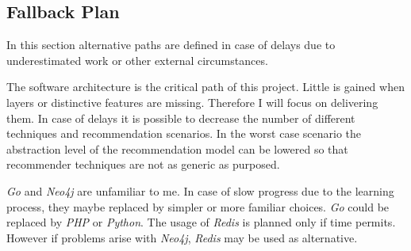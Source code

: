 \subsection{Fallback Plan}

In this section alternative paths are defined in case of delays due to underestimated work or other external circumstances.

The software architecture is the critical path of this project. Little is gained when layers or distinctive features are missing. Therefore I will focus on delivering them. In case of delays it is possible to decrease the number of different techniques and recommendation scenarios. In the worst case scenario the abstraction level of the recommendation model can be lowered so that recommender techniques are not as generic as purposed.

\emph{Go} and \emph{Neo4j} are unfamiliar to me. In case of slow progress due to the learning process, they maybe replaced by simpler or more familiar choices. \emph{Go} could be replaced by \emph{PHP} or \emph{Python}. The usage of \emph{Redis} is planned only if time permits. However if problems arise with \emph{Neo4j}, \emph{Redis} may be used as alternative.